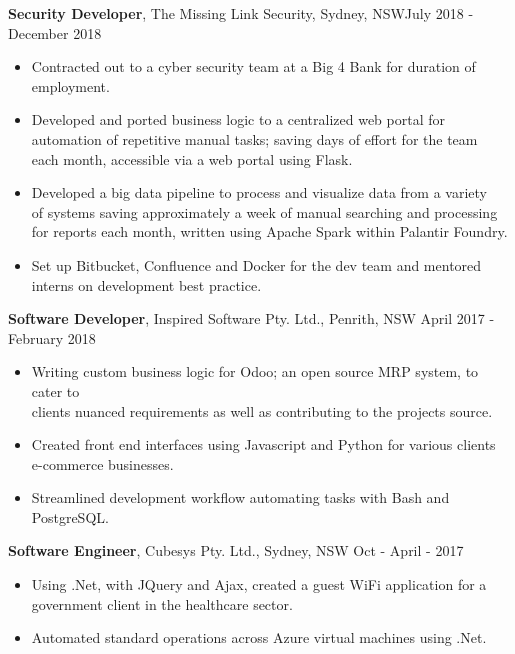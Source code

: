 \documentclass[margin]{res}
\begin{document}
\begin{resume}
\begin{itemize}
\end{itemize}

{\bf Security Developer},
	The Missing Link Security, Sydney, NSW\hfill July 2018 - December 2018
\begin{itemize} \itemsep 2pt  %
\item Contracted out to a cyber security team at a Big 4 Bank for duration of \\
	employment.

\item Developed and ported business logic to a centralized web portal for \\
	automation of repetitive manual tasks; saving days of effort for the team \\
		each month, accessible via a web portal using Flask.

\item Developed a big data pipeline to process and visualize data from a variety \\
	of systems saving approximately a week of manual searching and processing \\
		for reports each month, written using Apache Spark within Palantir Foundry.

\item Set up Bitbucket, Confluence and Docker for the dev team and mentored \\
	interns on development best practice.

\end{itemize}

{\bf Software Developer},
	Inspired Software Pty. Ltd., Penrith, NSW \hfill April 2017 - February 2018
\begin{itemize} \itemsep 2pt  %
\item Writing custom business logic for Odoo; an open source MRP system, to cater to \\
	clients nuanced requirements as well as contributing to the projects source.

\item  Created front end interfaces using Javascript and Python for various clients \\
	e-commerce businesses.

\item Streamlined development workflow automating tasks with Bash and PostgreSQL.
\end{itemize}

 {\bf Software Engineer},
	Cubesys Pty. Ltd., Sydney, NSW \hfill Oct - April - 2017
 \begin{itemize} \itemsep 2pt  %
 \item Using .Net, with JQuery and Ajax, created a guest WiFi application for a \\
	 government client in the healthcare sector.
 \item Automated standard operations across Azure virtual machines using .Net.
 \end{itemize}


\end{resume}
\end{document}
